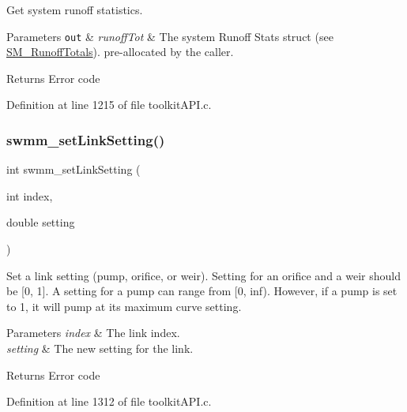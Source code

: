Get system runoff statistics. 


\begin{DoxyParams}[1]{Parameters}
\mbox{\tt out}  & {\em runoff\+Tot} & The system Runoff Stats struct (see \hyperlink{struct_s_m___runoff_totals}{S\+M\+\_\+\+Runoff\+Totals}). pre-\/allocated by the caller. \\
\hline
\end{DoxyParams}
\begin{DoxyReturn}{Returns}
Error code 
\end{DoxyReturn}


Definition at line 1215 of file toolkit\+A\+P\+I.\+c.

\mbox{\label{group__tkfuncs_gab44d2b1c21a6f750b0ce4c48ba16be81}} 
\subsubsection{\texorpdfstring{swmm\+\_\+set\+Link\+Setting()}{swmm\_setLinkSetting()}}
{\footnotesize\ttfamily int swmm\+\_\+set\+Link\+Setting (\begin{DoxyParamCaption}\item[{int}]{index,  }\item[{double}]{setting }\end{DoxyParamCaption})}



Set a link setting (pump, orifice, or weir). Setting for an orifice and a weir should be \mbox{[}0, 1\mbox{]}. A setting for a pump can range from \mbox{[}0, inf). However, if a pump is set to 1, it will pump at its maximum curve setting. 


\begin{DoxyParams}{Parameters}
{\em index} & The link index. \\
\hline
{\em setting} & The new setting for the link. \\
\hline
\end{DoxyParams}
\begin{DoxyReturn}{Returns}
Error code 
\end{DoxyReturn}


Definition at line 1312 of file toolkit\+A\+P\+I.\+c.

\mbox{\label{group__tkfuncs_ga6438a8a45d7712b8b02ba630cd8e1db3}} 
